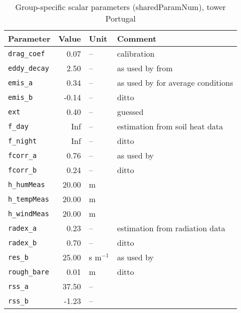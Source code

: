 \begin{table}[ht]
\centering
\caption{Group-specific scalar parameters (\textsf{sharedParamNum}), tower Portugal} 
\label{tab:portugaltower_sharedParamNum}
\begin{tabular}{lrll}
  \hline
Parameter & Value & Unit & Comment \\ 
  \hline
\verb!drag_coef! & 0.07 & -- & calibration \\ 
  \verb!eddy_decay! & 2.50 & -- & as used by \citet{shuttleworth85} from \citet{monteith73} \\ 
  \verb!emis_a! & 0.34 & -- & as used by \citet{maidment93} for average conditions \\ 
  \verb!emis_b! & -0.14 & -- & ditto \\ 
  \verb!ext! & 0.40 & -- & guessed \\ 
  \verb!f_day! & Inf & -- & estimation from soil heat data \\ 
  \verb!f_night! & Inf & -- & ditto \\ 
  \verb!fcorr_a! & 0.76 & -- & as used by \citet{maidment93} \\ 
  \verb!fcorr_b! & 0.24 & -- & ditto \\ 
  \verb!h_humMeas! & 20.00 & m &  \\ 
  \verb!h_tempMeas! & 20.00 & m &  \\ 
  \verb!h_windMeas! & 20.00 & m &  \\ 
  \verb!radex_a! & 0.23 & -- & estimation from radiation data \\ 
  \verb!radex_b! & 0.70 & -- & ditto \\ 
  \verb!res_b! & 25.00 & s m$^{-1}$ & as used by \citet{shuttleworth85} \\ 
  \verb!rough_bare! & 0.01 & m & ditto \\ 
  \verb!rss_a! & 37.50 & -- &  \\ 
  \verb!rss_b! & -1.23 & -- &  \\ 
   \hline
\end{tabular}
\end{table}

